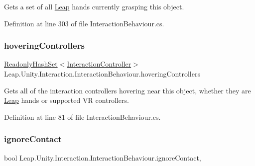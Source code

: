 Gets a set of all \mbox{\hyperlink{namespace_leap_1_1_unity_1_1_leap}{Leap}} hands currently grasping this object. 



Definition at line 303 of file Interaction\+Behaviour.\+cs.

\mbox{\label{class_leap_1_1_unity_1_1_interaction_1_1_interaction_behaviour_a0736f94902d69e2cd6d18cec54a1ffb6}} 
\subsubsection{\texorpdfstring{hoveringControllers}{hoveringControllers}}
{\footnotesize\ttfamily \mbox{\hyperlink{struct_leap_1_1_unity_1_1_readonly_hash_set}{Readonly\+Hash\+Set}}$<$\mbox{\hyperlink{class_leap_1_1_unity_1_1_interaction_1_1_interaction_controller}{Interaction\+Controller}}$>$ Leap.\+Unity.\+Interaction.\+Interaction\+Behaviour.\+hovering\+Controllers\hspace{0.3cm}{\ttfamily [get]}}



Gets all of the interaction controllers hovering near this object, whether they are \mbox{\hyperlink{namespace_leap_1_1_unity_1_1_leap}{Leap}} hands or supported VR controllers. 



Definition at line 81 of file Interaction\+Behaviour.\+cs.

\mbox{\label{class_leap_1_1_unity_1_1_interaction_1_1_interaction_behaviour_a812f158ddaabca6dd198c7133afcc486}} 
\subsubsection{\texorpdfstring{ignoreContact}{ignoreContact}}
{\footnotesize\ttfamily bool Leap.\+Unity.\+Interaction.\+Interaction\+Behaviour.\+ignore\+Contact\hspace{0.3cm}{\ttfamily [get]}, {\ttfamily [set]}}



